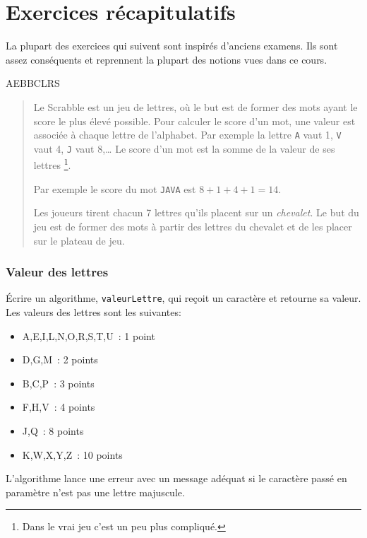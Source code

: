 \section{Exercices récapitulatifs}

	La plupart des exercices qui suivent sont inspirés d’anciens examens.  Ils
	sont assez conséquents et reprennent la plupart des notions vues dans ce
	cours.

	\begin{Exercice}{AEBBCLRS}

		\begin{quote}
		Le Scrabble est un jeu de lettres, où le but est de former des mots
		ayant le score le plus élevé possible.  Pour calculer le score d’un mot,
		une valeur est associée à chaque lettre de l’alphabet.  Par exemple la
		lettre \texttt{A} vaut 1, \texttt{V} vaut 4, \texttt{J} vaut 8,\dots{}
		Le score d’un mot est la somme de la valeur de ses lettres%
		\footnote{Dans le vrai jeu c’est un peu plus compliqué.}.

		Par exemple le score du mot \texttt{JAVA} est $8+1+4+1 = 14$.

		Les joueurs tirent chacun 7 lettres qu’ils placent sur un
		\emph{chevalet}.  Le but du jeu est de former des mots à partir des
		lettres du chevalet et de les placer sur le plateau de jeu.
		
		\end{quote}
	
		\subsubsection*{Valeur des lettres}
	
			\'Ecrire un algorithme, \texttt{valeurLettre}, 
			qui reçoit un caractère et retourne sa valeur. 
			Les valeurs des lettres sont les suivantes: 
			\begin{itemize}
			\item A,E,I,L,N,O,R,S,T,U~: 1 point
			\item D,G,M~: 2 points
			\item B,C,P~: 3 points
			\item F,H,V~: 4 points
			\item J,Q~: 8 points
			\item K,W,X,Y,Z~: 10 points
			\end{itemize}	

			L’algorithme lance une erreur avec un message adéquat 
			si le caractère passé en paramètre n’est pas une lettre majuscule.  
	

\end{Exercice}
